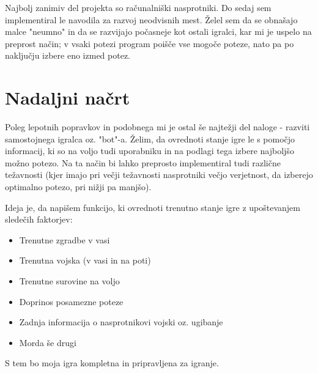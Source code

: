\documentclass[a4paper, 16pt]{article}
\begin{document}
Najbolj zanimiv del projekta so računalniški nasprotniki. Do sedaj sem implementiral le navodila za razvoj neodvisnih mest. Želel sem da se obnašajo malce "neumno" in 
da se razvijajo počasneje kot ostali igralci, kar mi je uspelo na preprost način; v vsaki potezi program poišče vse mogoče poteze, nato pa po naključju izbere eno izmed potez. 
 

\section{Nadaljni načrt}

Poleg lepotnih popravkov in podobnega mi je ostal še najtežji del naloge - razviti samostojnega igralca oz. "bot"-a. Želim, da ovrednoti stanje igre le s pomočjo informacij, 
ki so na voljo tudi uporabniku in na podlagi tega izbere najboljšo možno potezo. Na ta način bi lahko preprosto implementiral tudi različne težavnosti (kjer imajo pri večji 
težavnosti nasprotniki večjo verjetnost, da izberejo optimalno potezo, pri nižji pa manjšo).

Ideja je, da napišem funkcijo, ki ovrednoti trenutno stanje igre z upoštevanjem sledečih faktorjev:
\begin{itemize}
    \item Trenutne zgradbe v vasi
    \item Trenutna vojska (v vasi in na poti)
    \item Trenutne surovine na voljo
    \item Doprinos posamezne poteze
    \item Zadnja informacija o nasprotnikovi vojski oz. ugibanje
    \item Morda še drugi
\end{itemize}

S tem bo moja igra kompletna in pripravljena za igranje.
\end{document}
